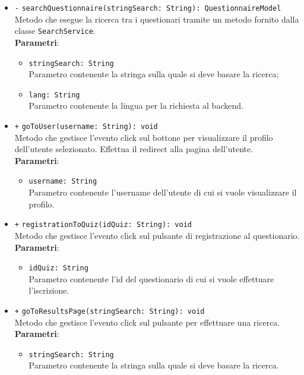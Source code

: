\begin{itemize}
\begin{itemize}
\begin{itemize}
		\end{itemize} 
		\item \texttt{-} \texttt{searchQuestionnaire(stringSearch: String): QuestionnaireModel} \\
		Metodo che esegue la ricerca tra i questionari tramite un metodo fornito dalla classe \texttt{SearchService}. \\
		\textbf{Parametri}:
		\begin{itemize}
			\item \texttt{stringSearch: String} \\
			Parametro contenente la stringa sulla quale si deve basare la ricerca;
			\item \texttt{lang: String} \\
			Parametro contenente la lingua per la richiesta al backend.
		\end{itemize} 
		\item \texttt{+} \texttt{goToUser(username: String): void} \\
		Metodo che gestisce l'evento click sul bottone per visualizzare il profilo dell'utente selezionato. Effettua il redirect alla pagina dell'utente.\\
		\textbf{Parametri}:
		\begin{itemize}
			\item \texttt{username: String} \\
			Parametro contenente l'username dell'utente di cui si vuole visualizzare il profilo.
		\end{itemize} 
		\item \texttt{+} \texttt{registrationToQuiz(idQuiz: String): void} \\
		Metodo che gestisce l'evento click sul pulsante di registrazione al questionario.\\
		\textbf{Parametri}:
		\begin{itemize}
			\item \texttt{idQuiz: String} \\
			Parametro contenente l'id del questionario di cui si vuole effettuare l'iscrizione.
		\end{itemize} 
		\item \texttt{+} \texttt{goToResultsPage(stringSearch: String): void} \\
		Metodo che gestisce l'evento click sul pulsante per effettuare una ricerca.\\
		\textbf{Parametri}:
		\begin{itemize}
			\item \texttt{stringSearch: String} \\
			Parametro contenente la stringa sulla quale si deve basare la ricerca.
		\end{itemize} 
	\end{itemize}
\end{itemize}

